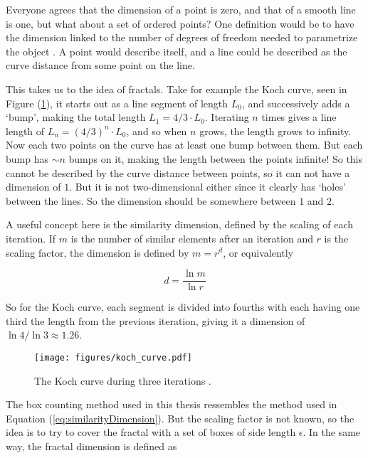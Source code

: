 Everyone agrees that the dimension of a point is zero, and that of a smooth line is one, but what about a set of ordered points? One definition would be to have the dimension linked to the number of degrees of freedom needed to parametrize the object \cite{strogatz:dynamics_chaos}. A point would describe itself, and a line could be described as the curve distance from some point on the line.

This takes us to the idea of fractals. Take for example the Koch curve, seen in Figure (\ref{fig:koch_curve}), it starts out as a line segment of length $L_0$, and successively adds a `bump', making the total length $L_1 = 4/3 \cdot L_0$. Iterating $n$ times gives a line length of $L_n = {(4 / 3)}^n \cdot L_0$, and so when $n$ grows, the length grows to infinity. Now each two points on the curve has at least one bump between them. But each bump has $\sim n$ bumps on it, making the length between the points infinite! So this cannot be described by the curve distance between points, so it can not have a dimension of $1$. But it is not two-dimensional either since it clearly has `holes' between the lines. So the dimension should be somewhere between $1$ and $2$.

A useful concept here is the similarity dimension, defined by the scaling of each iteration. If $m$ is the number of similar elements after an iteration and $r$ is the scaling factor, the dimension is defined by $m = r^d$, or equivalently

\begin{equation}
	d = \frac{\ln m}{\ln r}
\label{eq:similarityDimension}
\end{equation}

So for the Koch curve, each segment is divided into fourths with each having one third the length from the previous iteration, giving it a dimension of $\ln 4 / \ln 3 \approx 1.26$.

\begin{figure}[h!]
    \centering
        \texttt{[image: figures/koch\_curve.pdf]}
    \caption{The Koch curve during three iterations \cite{strogatz:dynamics_chaos}.}
    \label{fig:koch_curve}
\end{figure}

The box counting method used in this thesis ressembles the method used in Equation (\ref{eq:similarityDimension}). But the scaling factor is not known, so the idea is to try to cover the fractal with a set of boxes of side length $\epsilon$. In the same way, the fractal dimension is defined as \cite{strogatz:dynamics_chaos}

